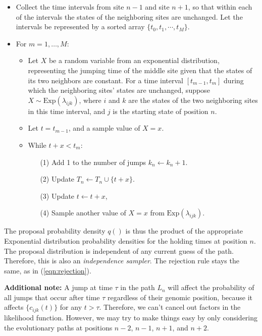 \documentclass[11pt]{article}
\begin{document}
\begin{itemize}
\item Collect the time intervals from site $n-1$ and site $n+1$, so
  that within each of the intervals the states of the neighboring
  sites are unchanged. Let the intervals be represented by a sorted
  array $\{t_0, t_1, \cdots, t_M\}$.
\item For $m = 1, \ldots, M$:
  \begin{itemize}
  \item Let $X$ be a random variable from an exponential
    distribution, representing the jumping time of the middle site
    given that the states of its two neighbors are constant.  For a time
    interval $[t_{m-1}, t_m]$ during which the neighboring sites' states
    are unchanged, suppose $X\sim \text{Exp}(\lambda_{ijk})$, where $i$
    and $k$ are the states of the two neighboring sites in this time
    interval, and $j$ is the starting state of position $n$.
  \item Let $t = t_{m-1}$, and a sample value of $X=x$.
  \item While $t +x < t_m$:
    \begin{enumerate}
    \item[(1)] Add 1 to the number of jumps $k_n \leftarrow k_n +1$.
    \item[(2)] Update $T_n \leftarrow T_n\cup\{t+x\}$.
    \item[(3)] Update $t \leftarrow  t+x$,
    \item[(4)] Sample another value of $X=x$ from $\text{Exp}(\lambda_{ijk})$. 
    \end{enumerate}
  \end{itemize}
\end{itemize}

The proposal probability density $q()$ is thus the product of the
appropriate Exponential distribution probability densities for the
holding times at position $n$. The proposal distribution is
independent of any current guess of the path. Therefore, this is also
an \textit{independence sampler}. The rejection rule stays the same,
as in (\ref{eqn:rejection}).


\textbf{Additional note:} A jump at time $\tau$ in the path $L_{n}$
will affect the probability of all jumps that occur after time $\tau$
regardless of their genomic position, because it affects
$\{c_{ijk}(t)\}$ for any $t > \tau$. Therefore, we can't cancel out
factors in the likelihood function. However, we may try to make things
easy by only considering the evolutionary paths at positions $n-2$,
$n-1$, $n+1$, and $n+2$. 
\end{document}
